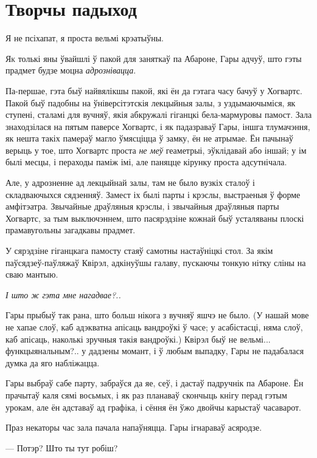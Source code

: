 \chapter{Творчы падыход}

\begin{chapterOpeningQuote}
Я не псіхапат, я проста вельмі крэатыўны.
\end{chapterOpeningQuote}

\lettrine{Я}{к} толькі яны ўвайшлі ў пакой для заняткаў па Абароне, Гары адчуў, што 
гэты прадмет будзе моцна \emph{адрознівацца}.

Па-першае, гэта быў найвялікшы пакой, які ён да гэтага часу бачуў у Хогвартс. Пакой
быў падобны на ўніверсітэтскія лекцыйныя залы, з уздымаючыміся, як ступені, сталамі 
для вучняў, якія абкружалі гіганцкі бела-мармуровы памост. Зала знаходзілася на 
пятым паверсе Хогвартс, і як падазраваў Гары, іншга тлумачэння, як нешта такіх 
памераў магло ўмясціцца ў замку, ён не атрымае. Ён пачынаў верыць у тое, што 
Хогвартс проста \emph{не меў} геаметрыі, эўклідавай або іншай; у ім былі месцы,
і пераходы паміж імі, але паняцце кірунку проста адсутнічала.

Але, у адрозненне ад лекцыйнай залы, там не было вузкіх сталоў і складваючыхся
сядзенняў. Замест іх былі парты і крэслы, 
выстраеныя ў форме амфітэатра. Звычайные драўляныя крэслы, і звычайныя драўляныя
парты Хогвартс, за тым выключэннем, што пасярэдзіне кожнай быў усталяваны плоскі
прамавугольны загадкавы прадмет.

У сярэдзіне гіганцкага памосту стаяў самотны настаўніцкі стол. За якім 
паўсядзеў-паўляжаў Квірэл, адкінуўшы галаву, пускаючы тонкую нітку сліны на 
сваю мантыю.

\emph{І што ж гэта мне нагадвае?..}

Гары прыбыў так рана, што больш нікога з вучняў яшчэ не было. (У нашай мове 
не хапае слоў, каб адэкватна апісаць вандроўкі ў часе; у асабістасці,
няма слоў, каб апісаць, наколькі зручныя такія вандроўкі.)
Квірэл быў не вельмі... функцыянальным?.. у дадзены момант, і ў любым 
выпадку, Гары не падабалася думка да яго набліжацца. 

Гары выбраў сабе парту, забраўся да яе, сеў, і дастаў падручнік па Абароне. 
Ён прачытаў каля сямі восьмых, і як раз планаваў скончыць кнігу перад гэтым урокам,
але ён адставаў ад графіка, і сёння ён ўжо двойчы карыстаў часаварот.

Праз некаторы час зала пачала напаўняцца. Гары ігнараваў асяродзе.

--- Потэр? Што ты тут робіш?

